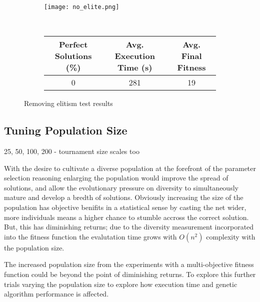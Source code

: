 \begin{figure}
	\centering
	\begin{subfigure}[ht]{0.49\textwidth}
		\texttt{[image: no\_elite.png]}
		\vspace{1em}
	\end{subfigure}
	~
	\begin{subfigure}[ht]{\textwidth}
		\centering
		\begin{tabular}{ccc}
			\toprule
			\bfseries{Perfect Solutions (\%)} &
			\bfseries{Avg. Execution Time (s)} & \bfseries{Avg. Final Fitness}\\
			\midrule
			0 & 281 & 19\\
			\bottomrule
		\end{tabular}
	\end{subfigure}

	\caption[Removing elitism test results]{Removing elitism test results}
	\label{fig:no_elitism}
\end{figure}

\subsection{Tuning Population Size \label{ss:pop_size}}
25, 50, 100, 200 - tournament size scales too

With the desire to cultivate a diverse population at the forefront of the parameter
selection reasoning enlarging the population would improve the spread of solutions,
and allow the evolutionary pressure on diversity to simultaneously mature and
develop a bredth of solutions.
Obviously increasing the size of the population has objective benifits in a statistical
sense by casting the net wider, more individuals means a higher chance to stumble
accross the correct solution.
But, this has diminishing returns; due to the diversity measurement incorporated into
the fitness function the evalutation time grows with $O(n^2)$ complexity with the
population size.

The increased population size from the experiments with a multi-objective
fitness function could be beyond the point of diminishing returns. To explore this
further trials varying the population size to explore how execution time and
genetic algorithm performance is affected.

